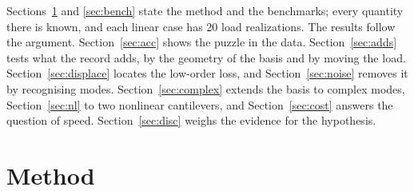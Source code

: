 \documentclass[preprint,12pt]{elsarticle}
\begin{document}
Sections~\ref{sec:method} and \ref{sec:bench} state the method and the benchmarks; every quantity there is known, and each linear case has 20 load realizations.
The results follow the argument.
Section~\ref{sec:acc} shows the puzzle in the data.
Section~\ref{sec:adds} tests what the record adds, by the geometry of the basis and by moving the load.
Section~\ref{sec:displace} locates the low-order loss, and Section~\ref{sec:noise} removes it by recognising modes.
Section~\ref{sec:complex} extends the basis to complex modes, Section~\ref{sec:nl} to two nonlinear cantilevers, and Section~\ref{sec:cost} answers the question of speed.
Section~\ref{sec:disc} weighs the evidence for the hypothesis.


\section{Method}\label{sec:method}
\end{document}
